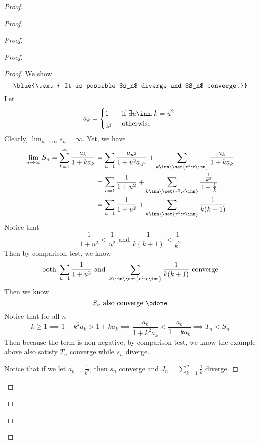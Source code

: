 \documentclass{report}
\begin{document}
\begin{proof}
\begin{proof}
\begin{proof}
\begin{proof}
\begin{proof}
We show
\begin{equation*}
\blue{\text{ It is possible $s_n$ diverge and $S_n$ converge.}}
\end{equation*}
Let 
\begin{equation*}
a_k=\begin{cases}
  1& \text{ if $\exists u\inn, k=u^2$ }\\
  \frac{1}{k^2}& \text{ otherwise }
\end{cases}
\end{equation*}
Clearly,  $\lim_{n\to\infty}s_n=\infty$. Yet, we have
\begin{align*}
  \lim_{n\to\infty}S_n=\sum_{k=1}^\infty \frac{a_k}{1+ka_k}&=\sum_{u=1}\frac{a_{u^2}}{1+u^2a_{u^2}}+\sum_{k\inn\setminus \set{r^2:r\inn}}\frac{a_k}{1+ka_k}\\
&=\sum_{u=1}\frac{1}{1+u^2}+\sum_{k\inn\setminus \set{r^2:r\inn}}\frac{\frac{1}{k^2}}{1+\frac{1}{k}}\\
&=\sum_{u=1}\frac{1}{1+u^2}+\sum_{k\inn\setminus \set{r^2:r\inn}} \frac{1}{k(k+1)}
\end{align*}
Notice that 
\begin{equation*}
\frac{1}{1+u^2}<\frac{1}{u^2}\text{ and }\frac{1}{k(k+1)}<\frac{1}{k^2}
\end{equation*}
Then by comparison test, we know 
\begin{equation*}
\text{ both }\sum_{u=1}\frac{1}{1+u^2}\text{ and }\sum_{k\inn\setminus \set{r^2:r\inn}} \frac{1}{k(k+1)}\text{ converge }
\end{equation*}
Then we know
\begin{equation*}
S_n\text{ also converge }\bdone
\end{equation*}
Notice that for all $n$
\begin{equation*}
k\geq 1\implies 1+k^2a_k>1+ka_k\implies \frac{a_k}{1+k^2a_k}<\frac{a_k}{1+ka_k}\implies T_n<S_n
\end{equation*}
Then because the term is non-negative, by comparison test, we know the example above also satisfy $T_n$ converge while $s_n$ diverge.

Notice that if we let $a_k=\frac{1}{k^2}$, then $s_n$ converge and $J_n=\sum_{k=1}^n \frac{1}{k}$ diverge. 


\end{proof}
\end{proof}
\end{proof}
\end{proof}
\end{proof}
\end{document}
